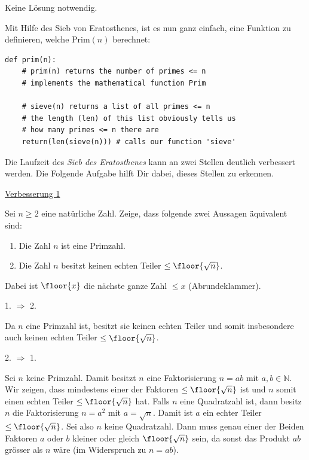 \begin{Answer}

Keine Lösung notwendig.
\end{Answer}


Mit Hilfe des Sieb von Eratosthenes, ist es nun ganz einfach, eine Funktion zu definieren, welche $\text{Prim}(n)$ berechnet:
\begin{verbatim}
def prim(n):
    # prim(n) returns the number of primes <= n
    # implements the mathematical function Prim

    # sieve(n) returns a list of all primes <= n
    # the length (len) of this list obviously tells us
    # how many primes <= n there are
    return(len(sieve(n))) # calls our function 'sieve'
\end{verbatim}
Die Laufzeit des \textit{Sieb des Eratosthenes} kann an zwei Stellen deutlich verbessert werden. Die Folgende Aufgabe hilft Dir dabei, dieses Stellen zu erkennen.


\begin{Exercise}
\underline{Verbesserung 1}

Sei $n\geq 2$ eine natürliche Zahl. Zeige, dass folgende zwei Aussagen äquivalent sind:
\begin{enumerate}
    \item Die Zahl $n$ ist eine Primzahl.
    \item Die Zahl $n$ besitzt keinen echten Teiler $\leq \floor{\sqrt{n}}$.
\end{enumerate}
Dabei ist $\floor{x}$ die nächste ganze Zahl $\leq x$ (Abrundeklammer).
\end{Exercise}
\begin{Answer}

1. $\Rightarrow$ 2.

Da $n$ eine Primzahl ist, besitzt sie keinen echten Teiler und somit insbesondere auch keinen echten Teiler $\leq \floor{\sqrt{n}}$.

2. $\Rightarrow$ 1.

Sei $n$ keine Primzahl. Damit besitzt $n$ eine Faktorisierung $n = ab$ mit $a,b\in\mathbb{N}$. Wir zeigen, dass mindestens einer der Faktoren $\leq \floor{\sqrt{n}}$ ist und $n$ somit einen echten Teiler $\leq \floor{\sqrt{n}}$ hat. Falls $n$ eine Quadratzahl ist, dann besitz $n$ die Faktorisierung $n = a^2$ mit $a = \sqrt{n}$. Damit ist $a$ ein echter Teiler $\leq \floor{\sqrt{n}}$. Sei also $n$ keine Quadratzahl. Dann muss  genau einer der Beiden Faktoren $a$ oder $b$ kleiner oder gleich $\floor{\sqrt{n}}$ sein, da sonst das Produkt $ab$ grösser als $n$ wäre (im Widerspruch zu $n = ab$).
\end{Answer}



